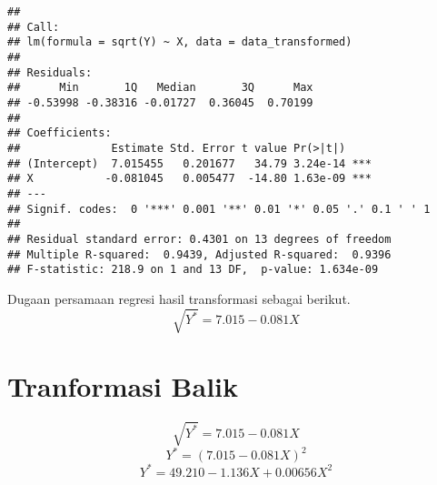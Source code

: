 \documentclass[
]{article}
\begin{document}
\begin{verbatim}
## 
## Call:
## lm(formula = sqrt(Y) ~ X, data = data_transformed)
## 
## Residuals:
##      Min       1Q   Median       3Q      Max 
## -0.53998 -0.38316 -0.01727  0.36045  0.70199 
## 
## Coefficients:
##              Estimate Std. Error t value Pr(>|t|)    
## (Intercept)  7.015455   0.201677   34.79 3.24e-14 ***
## X           -0.081045   0.005477  -14.80 1.63e-09 ***
## ---
## Signif. codes:  0 '***' 0.001 '**' 0.01 '*' 0.05 '.' 0.1 ' ' 1
## 
## Residual standard error: 0.4301 on 13 degrees of freedom
## Multiple R-squared:  0.9439, Adjusted R-squared:  0.9396 
## F-statistic: 218.9 on 1 and 13 DF,  p-value: 1.634e-09
\end{verbatim}

Dugaan persamaan regresi hasil transformasi sebagai berikut. \[
\sqrt {Y^*} = 7.015 - 0.081X
\]

\hypertarget{tranformasi-balik}{%
\section{Tranformasi Balik}\label{tranformasi-balik}}

\[
\sqrt {Y^*} = 7.015 - 0.081X
\] \[
Y^* = (7.015 - 0.081X)^2
\] \[
Y^* = 49.210 - 1.136X + 0.00656X^2
\]
\end{document}
